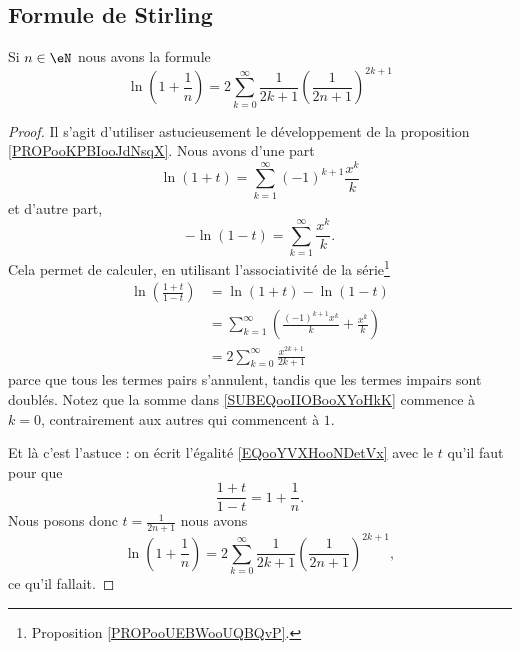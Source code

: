 \subsection{Formule de Stirling}

\begin{lemma}     \label{LEMooDXJOooOGFcIv}
    Si \( n\in \eN\) nous avons la formule
    \begin{equation}
        \ln(1+\frac{1}{ n })=2\sum_{k=0}^{\infty} \frac{1}{ 2k+1 } \left( \frac{1}{ 2n+1 } \right)^{2k+1}
    \end{equation}
\end{lemma}

\begin{proof}
    Il s'agit d'utiliser astucieusement le développement de la proposition \ref{PROPooKPBIooJdNsqX}. Nous avons d'une part
    \begin{equation}
        \ln(1+t)=\sum_{k=1}^{\infty}(-1)^{k+1}\frac{ x^k }{ k }
    \end{equation}
    et d'autre part,
    \begin{equation}
        -\ln(1-t)=\sum_{k=1}^{\infty}\frac{ x^k }{ k }.
    \end{equation}
    Cela permet de calculer, en utilisant l'associativité de la série\footnote{Proposition \ref{PROPooUEBWooUQBQvP}.}
    \begin{subequations}\label{EQooYVXHooNDetVx}
        \begin{align} 
            \ln\left( \frac{ 1+t }{ 1-t } \right)&=\ln(1+t)-\ln(1-t)\\
            &=\sum_{k=1}^{\infty}\left( \frac{ (-1)^{k+1}x^k }{ k }+\frac{ x^k }{ k } \right)\\
            &=2\sum_{k=0}^{\infty}\frac{ x^{2k+1} }{ 2k+1 }     \label{SUBEQooIIOBooXYoHkK}
        \end{align}
    \end{subequations}
    parce que tous les termes pairs s'annulent, tandis que les termes impairs sont doublés. Notez que la somme dans \eqref{SUBEQooIIOBooXYoHkK} commence à \( k=0\), contrairement aux autres qui commencent à \( 1\).
   
    Et là c'est l'astuce : on écrit l'égalité \eqref{EQooYVXHooNDetVx} avec le \( t\) qu'il faut pour que
    \begin{equation}
        \frac{ 1+t }{ 1-t }=1+\frac{1}{ n }.
    \end{equation}
    Nous posons donc \( t=\frac{1}{ 2n+1 }\) nous avons
    \begin{equation}
        \ln\left( 1+\frac{1}{ n } \right)=2\sum_{k=0}^{\infty}  \frac{1}{ 2k+1 } \left( \frac{1}{ 2n+1 } \right)^{2k+1},
    \end{equation}
    ce qu'il fallait.
\end{proof}


